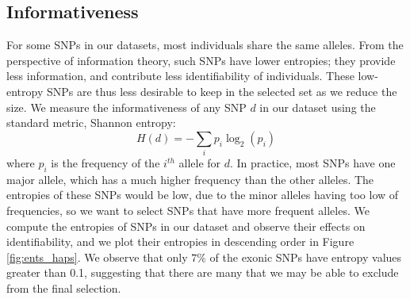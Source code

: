 \documentclass[14pt, oneside]{article}   	%
\begin{document}
\subsection{Informativeness}\label{sec:inf}
For some SNPs in our datasets, most individuals share the same alleles.
From the perspective of information theory, such SNPs have lower entropies;
they provide less information, and contribute less identifiability of individuals.
These low-entropy SNPs are thus less desirable to keep in the selected set as we reduce the size.
We measure the informativeness of any SNP $d$ in our dataset using the standard metric, Shannon entropy:
\[
H(d) = - \sum_{i}{p_i \log_2(p_i)}
\]
where $p_i$ is the frequency of the $i^{th}$ allele for $d$.
In practice, most SNPs have one major allele, which has a much higher frequency than the other alleles.
The entropies of these SNPs would be low, due to the minor alleles having too low of frequencies,
so we want to select SNPs that have more frequent alleles.
We compute the entropies of SNPs in our dataset and observe their effects on identifiability,
and we plot their entropies in descending order in Figure \ref{fig:ents_haps}.
We observe that only $7\%$ of the exonic SNPs have entropy values greater than 0.1,
suggesting that there are many that we may be able to exclude from the final selection.

%
\end{document}
